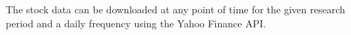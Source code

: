 The stock data can be downloaded at any point of time for the given research period and a daily frequency using the Yahoo Finance API.

